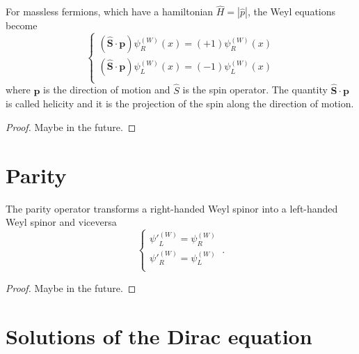     For massless fermions, which have a hamiltonian $\hat H = |\hat p|$, the Weyl equations become
    \begin{equation*}
        \begin{cases}
            (\hat{\mathbf S} \cdot \mathbf p) \psi^{(W)}_R (x) = (+1) \psi^{(W)}_R (x) \\
            (\hat{\mathbf S} \cdot \mathbf p) \psi^{(W)}_L (x) = (-1) \psi^{(W)}_L (x) \\
        \end{cases}
    \end{equation*}
    where $\mathbf p$ is the direction of motion and $\hat S$ is the spin operator. The quantity $\hat{\mathbf S} \cdot \mathbf p$ is called helicity and it is the projection of the spin along the direction of motion. 
    \begin{proof}
        Maybe in the future.
    \end{proof}

\section{Parity} 

    The parity operator transforms a right-handed Weyl spinor into a left-handed Weyl spinor and viceversa
    \begin{equation*}
        \begin{cases}
            {\psi'}_L^{(W)} = \psi_R^{(W)} \\
            {\psi'}_R^{(W)} = \psi_L^{(W)} \\
        \end{cases} ~.
    \end{equation*}
    \begin{proof}
        Maybe in the future.
    \end{proof}

\section{Solutions of the Dirac equation}

